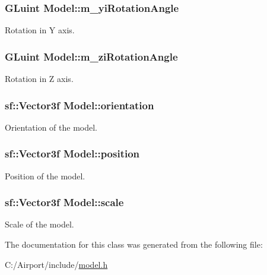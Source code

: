 \subsubsection[{\texorpdfstring{m\+\_\+yi\+Rotation\+Angle}{m_yiRotationAngle}}]{\setlength{\rightskip}{0pt plus 5cm}G\+Luint Model\+::m\+\_\+yi\+Rotation\+Angle\hspace{0.3cm}{\ttfamily [private]}}\hypertarget{class_model_aacf906903bfaa80cb02c46a299016f5e}{}\label{class_model_aacf906903bfaa80cb02c46a299016f5e}
Rotation in Y axis. 
\subsubsection[{\texorpdfstring{m\+\_\+zi\+Rotation\+Angle}{m_ziRotationAngle}}]{\setlength{\rightskip}{0pt plus 5cm}G\+Luint Model\+::m\+\_\+zi\+Rotation\+Angle\hspace{0.3cm}{\ttfamily [private]}}\hypertarget{class_model_a70be5d2acec40543ec2b9186dfc7cb43}{}\label{class_model_a70be5d2acec40543ec2b9186dfc7cb43}
Rotation in Z axis. 
\subsubsection[{\texorpdfstring{orientation}{orientation}}]{\setlength{\rightskip}{0pt plus 5cm}sf\+::\+Vector3f Model\+::orientation\hspace{0.3cm}{\ttfamily [private]}}\hypertarget{class_model_a94eb6111227ec3db203681abd21ebeca}{}\label{class_model_a94eb6111227ec3db203681abd21ebeca}
Orientation of the model. 
\subsubsection[{\texorpdfstring{position}{position}}]{\setlength{\rightskip}{0pt plus 5cm}sf\+::\+Vector3f Model\+::position\hspace{0.3cm}{\ttfamily [private]}}\hypertarget{class_model_a2f25a152b6212faf7d23e6d6ab103d61}{}\label{class_model_a2f25a152b6212faf7d23e6d6ab103d61}
Position of the model. 
\subsubsection[{\texorpdfstring{scale}{scale}}]{\setlength{\rightskip}{0pt plus 5cm}sf\+::\+Vector3f Model\+::scale\hspace{0.3cm}{\ttfamily [private]}}\hypertarget{class_model_aac1cda61a954d28aa2ee94a1b23de4a9}{}\label{class_model_aac1cda61a954d28aa2ee94a1b23de4a9}
Scale of the model. 

The documentation for this class was generated from the following file\+:\begin{DoxyCompactItemize}
\item 
C\+:/\+Airport/include/\hyperlink{model_8h}{model.\+h}\end{DoxyCompactItemize}
